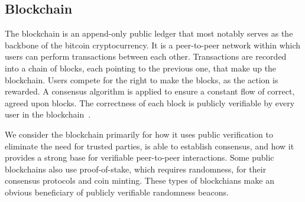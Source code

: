 \subsection{Blockchain}\label{subsec:blockchain}
The blockchain is an append-only public ledger that most notably serves as the backbone of the bitcoin cryptocurrency.
It is a peer-to-peer network within which users can perform transactions between each other.
Transactions are recorded into a chain of blocks, each pointing to the previous one, that make up the blockchain.
Users compete for the right to make the blocks, as the action is rewarded.
A consensus algorithm is applied to ensure a constant flow of correct, agreed upon blocks.
The correctness of each block is publicly verifiable by every user in the blockchain~\cite{nakamoto2008bitcoin}.

We consider the blockchain primarily for how it uses public verification to eliminate the need for trusted parties, is able to establish consensus, and how it provides a strong base for verifiable peer-to-peer interactions. Some public blockchains also use proof-of-stake, which requires randomness, for their consensus protocols and coin minting. These types of blockchians make an obvious beneficiary of publicly verifiable randomness beacons. 

